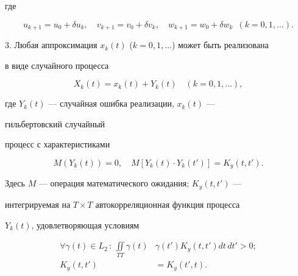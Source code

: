 где 


\begin{equation} 


u_{k+1}=u_0+\delta u_k,\quad 


v_{k+1}=v_0+\delta v_k,\quad 


w_{k+1}=w_0+\delta w_k\ \;(k=0,1,\dotsc). 


\end{equation} 


 


3. Любая аппроксимация $x_k(t)$ ($k=0,1,\dotsc$) может быть реализована 


в виде случайного процесса 


\begin{equation} 


X_k(t)=x_k(t)+Y_k(t)\quad (k=0,1,\dotsc), 


\end{equation} 


где $Y_k(t)$ --- случайная ошибка реализации, $x_k(t)$ --- 


гильбертовский случайный 


процесс с характеристиками 


\begin{equation} 


M(Y_k(t))=0,\quad 


M[Y_k(t)\cdot Y_k(t')]=K_y(t,t'). 


\end{equation} 


Здесь $M$ --- операция математического ожидания; $K_y(t,t')$ --- 


интегрируемая на $T\times T$ автокорреляционная функция процесса 


$Y_k(t)$, удовлетворяющая условиям 


\begin{equation} 


\begin{split} 


\forall\gamma(t)\in L_2\,:\,\iint\limits_{TT} 


\gamma(t)&\gamma(t')K_y(t,t')dt\,dt'>0;\\ 


K_y(t,t')&=K_y(t',t). 


\end{split} 


\end{equation} 



